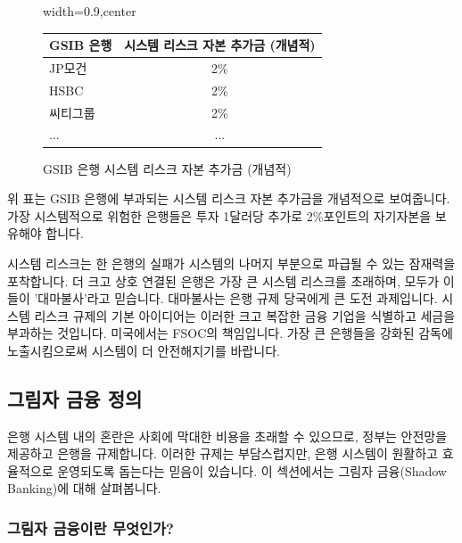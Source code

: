 \documentclass[11pt,a4paper]{article}
\theoremstyle{definition}
\begin{document}
\begin{figure}[h!]
    \centering
    \begin{adjustbox}{width=0.9\textwidth,center}
    \begin{tabular}{lc}
        \toprule
        \textbf{GSIB 은행} & \textbf{시스템 리스크 자본 추가금 (개념적)} \\
        \midrule
        JP모건 & 2\% \\
        HSBC & 2\% \\
        씨티그룹 & 2\% \\
        ... & ... \\
        \bottomrule
    \end{tabular}
    \end{adjustbox}
    \caption{GSIB 은행 시스템 리스크 자본 추가금 (개념적)}
    \label{tab:gsib_surcharges}
\end{figure}
\vspace{0.5em}
위 표는 GSIB 은행에 부과되는 시스템 리스크 자본 추가금을 개념적으로 보여줍니다. 가장 시스템적으로 위험한 은행들은 투자 1달러당 추가로 2\%포인트의 자기자본을 보유해야 합니다.

\begin{summarybox}[title=대마불사 요약]
시스템 리스크는 한 은행의 실패가 시스템의 나머지 부분으로 파급될 수 있는 잠재력을 포착합니다. 더 크고 상호 연결된 은행은 가장 큰 시스템 리스크를 초래하며, 모두가 이들이 '대마불사'라고 믿습니다. 대마불사는 은행 규제 당국에게 큰 도전 과제입니다. 시스템 리스크 규제의 기본 아이디어는 이러한 크고 복잡한 금융 기업을 식별하고 세금을 부과하는 것입니다. 미국에서는 FSOC의 책임입니다. 가장 큰 은행들을 강화된 감독에 노출시킴으로써 시스템이 더 안전해지기를 바랍니다.
\end{summarybox}

\newpage
\subsection{그림자 금융 정의}

은행 시스템 내의 혼란은 사회에 막대한 비용을 초래할 수 있으므로, 정부는 안전망을 제공하고 은행을 규제합니다. 이러한 규제는 부담스럽지만, 은행 시스템이 원활하고 효율적으로 운영되도록 돕는다는 믿음이 있습니다. 이 섹션에서는 그림자 금융(Shadow Banking)에 대해 살펴봅니다.

\subsubsection{그림자 금융이란 무엇인가?}
\end{document}
